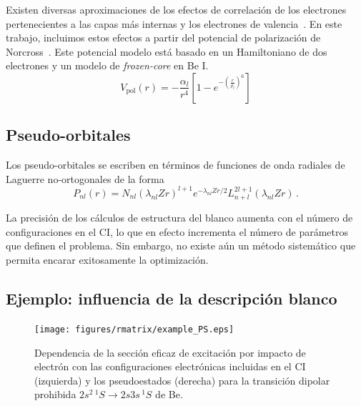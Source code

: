 Existen diversas aproximaciones de los efectos de correlación de los 
electrones pertenecientes a las capas más internas y los electrones de 
valencia~\cite{Seaton:72,Loughlin:73,Migdalek:78}. En este trabajo, 
incluimos estos efectos a partir del potencial de polarización de 
Norcross~\cite{Norcross:76}. Este potencial modelo está basado en un 
Hamiltoniano de dos electrones y un modelo de \textit{frozen-core} en 
Be I.
\begin{equation*}
 V_{\textrm{pol}}(r) = -\frac{\alpha_l}{r^4}\left[1-
e^{-\left(\tfrac{r}{\rho_l}\right)^6}\right]
\label{eq:Norcross-pot}
\end{equation*}

\subsection{Pseudo-orbitales}

Los pseudo-orbitales se escriben en términos de funciones de onda 
radiales de Laguerre no-ortogonales de la forma
\begin{equation}
P_{nl}(r) = N_{nl}(\lambda_{nl}Zr)^{l+1} e^{-\lambda_{nl}Zr/2} 
L_{n+l}^{2l+1}(\lambda_{nl}Zr)\,.
\label{eq:pseudo}
\end{equation}

La precisión de los cálculos de estructura del blanco aumenta con el 
número de 
configuraciones en el CI, lo que en efecto incrementa el número de 
parámetros que definen el problema. Sin embargo, no existe aún un método 
sistemático que permita encarar exitosamente la optimización.



\newpage
\subsection{Ejemplo: influencia de la descripción blanco}
\begin{figure}[t]
\centering
\texttt{[image: figures/rmatrix/example\_PS.eps]}
\caption[Dependencia de la sección eficaz de excitación con las 
configuraciones electrónicas y los pseudoestados.]
{Dependencia de la sección eficaz de excitación por impacto de
electrón con las configuraciones electrónicas incluidas en el CI 
(izquierda) y los pseudoestados (derecha) para la transición dipolar 
prohibida $2s^2\,^1S \rightarrow 2s3s\,^1S$ de Be.}
\label{fig:dependencia-CI}
\end{figure}

